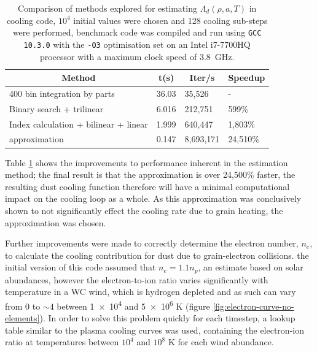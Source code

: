 \begin{table}
  \centering
  \begin{tabular}{llll}
    \hline
    \multicolumn{1}{c}{\textbf{Method}} & \multicolumn{1}{c}{\textbf{t(s)}} & \multicolumn{1}{c}{\textbf{Iter/s}} & \multicolumn{1}{c}{\textbf{Speedup}} \\ \hline
    400 bin integration by parts & 36.03 & 35,526 & - \\
    Binary search + trilinear & 6.016 & 212,751 & 599\% \\
    Index calculation + bilinear + linear & 1.999 & 640,447 & 1,803\% \\
    \cite{dwek_infrared_1981} approximation & 0.147 & 8,693,171 & 24,510\% \\ \hline
  \end{tabular}
  \caption[Dust cooling calculation comparison]{Comparison of methods explored for estimating $\Lambda_d(\rho,a,T)$ in cooling code, $10^4$ initial values were chosen and 128 cooling sub-steps were performed, benchmark code was compiled and run using \texttt{GCC 10.3.0} with the \texttt{-O3} optimisation set on an Intel i7-7700HQ processor with a maximum clock speed of \SI{3.8}{\giga\hertz}.}
  \label{tab:electron-speedup}
\end{table}

Table \ref{tab:electron-speedup} shows the improvements to performance inherent in the estimation method; the final result is that the approximation is over 24,500\% faster, the resulting dust cooling function therefore will have a minimal computational impact on the cooling loop as a whole.
As this approximation was conclusively shown to not significantly effect the cooling rate due to grain heating, the approximation was chosen.

Further improvements were made to correctly determine the electron number, $n_e$, to calculate the cooling contribution for dust due to grain-electron collisions.
the initial version of this code assumed that $n_e = 1.1 n_p$, an estimate based on solar abundances, however the electron-to-ion ratio varies significantly with temperature in a WC wind, which is hydrogen depleted and as such can vary from 0 to $\sim 4$ between \num{1e4} and \num{5e6} \si{\kelvin} (figure \ref{fig:electron-curve-no-elements}).
In order to solve this problem quickly for each timestep, a lookup table similar to the plasma cooling curves was used, containing the electron-ion ratio at temperatures between $10^4$ and $10^8$ \si{\kelvin} for each wind abundance.

